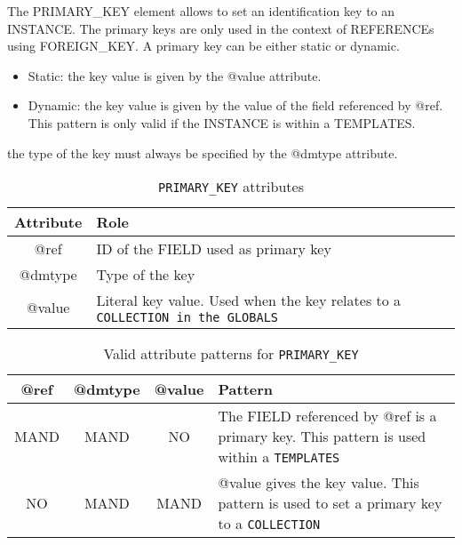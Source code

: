 The PRIMARY\_KEY element allows to set an identification key to an INSTANCE. The primary keys are only used in the context of REFERENCEs using FOREIGN\_KEY.
A primary key can be either static or dynamic.

\begin{itemize}
    \item Static: the key value is given by the @value attribute.
    \item Dynamic: the key value is given by the value of the field referenced by @ref. 
    This pattern is only valid if the INSTANCE is within a TEMPLATES. 
\end{itemize}

the type of the key must always be specified by the @dmtype attribute. 

\begin{table}[!htbp]
\small
\centering
\begin{tabulary}{\linewidth}{|c|J|}       
       \hline 
            \textbf{Attribute} & 
            \textbf {Role}\\
       \hline         \hline  
            @ref& 
            ID of the FIELD used as primary key \\
        \hline 
            @dmtype & 
            Type of the key \\
        \hline 
            @value & 
            Literal key value. Used when the key relates to a \texttt{COLLECTION in the \texttt{GLOBALS}} \\
        \hline 
     \end{tabulary}
     \caption{\texttt{PRIMARY\_KEY} attributes} 
     \label{tbl:primarykey-att}
 \end{table}

\begin{table}[!htbp]
\small
\centering
\begin{tabulary}{\linewidth}{|c|c|c|J|}
    \hline 
        \textbf{@ref} &
        \textbf{@dmtype} &
        \textbf{@value} &
        \textbf{Pattern}\\
    \hline      \hline  
        MAND &           
        MAND &           
        NO &           
        The FIELD referenced by @ref is a primary key. This pattern is used within a \texttt{TEMPLATES} \\
    \hline     
        NO &           
        MAND &           
        MAND &           
        @value gives the key value. This pattern is used to set a primary key to a \texttt{COLLECTION}\\
   \hline 
\end{tabulary}
     \caption{Valid attribute patterns for  \texttt{PRIMARY\_KEY}}
     \label{tbl:primarykey-pattern}
\end{table}
